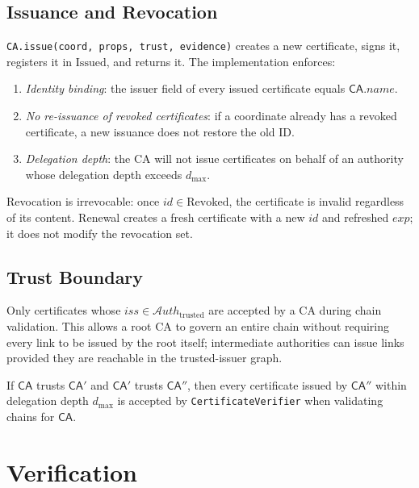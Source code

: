 \documentclass[11pt]{article}
\newcommand{\CA}{\mathsf{CA}}                  %
\newcommand{\certid}{\mathit{id}}              %
\newcommand{\certissuer}{\mathit{iss}}         %
\newcommand{\certexpiry}{\mathit{exp}}         %
\newcommand{\Issued}{\mathrm{Issued}}          %
\newcommand{\Revoked}{\mathrm{Revoked}}        %
\newcommand{\AuthSet}{\mathcal{A}\!\mathit{uth}} %
\begin{document}
\subsection{Issuance and Revocation}

\texttt{CA.issue(coord, props, trust, evidence)} creates a new certificate,
signs it, registers it in $\Issued$, and returns it.
The implementation enforces:

\begin{enumerate}
  \item \emph{Identity binding}: the issuer field of every issued certificate
        equals $\CA.\mathit{name}$.
  \item \emph{No re-issuance of revoked certificates}: if a coordinate already
        has a revoked certificate, a new issuance does not restore the old ID.
  \item \emph{Delegation depth}: the CA will not issue certificates on behalf
        of an authority whose delegation depth exceeds $d_{\max}$.
\end{enumerate}

Revocation is irrevocable: once $\certid \in \Revoked$, the certificate
is invalid regardless of its content.
Renewal creates a fresh certificate with a new $\certid$ and refreshed
$\certexpiry$; it does not modify the revocation set.

\subsection{Trust Boundary}

Only certificates whose $\certissuer \in \AuthSet_{\mathrm{trusted}}$ are
accepted by a CA during chain validation.
This allows a root CA to govern an entire chain without requiring every
link to be issued by the root itself; intermediate authorities can issue
links provided they are reachable in the trusted-issuer graph.

\begin{proposition}\label{prop:auth-closure}
If $\CA$ trusts $\CA'$ and $\CA'$ trusts $\CA''$, then every certificate
issued by $\CA''$ within delegation depth $d_{\max}$ is accepted by
\texttt{CertificateVerifier} when validating chains for $\CA$.
\end{proposition}

\section{Verification}\label{sec:verify}
\end{document}
